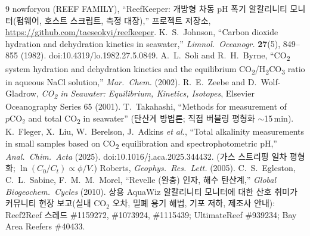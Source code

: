 \documentclass[11pt]{article}
\newcommand{\co}{\ensuremath{\mathrm{CO_2}}}
\begin{document}
\begin{thebibliography}{9}
 nowforyou (REEF FAMILY), ``ReefKeeper: 개방형 차동 pH 폭기
알칼리니티 모니터(펌웨어, 호스트 스크립트, 측정 대장),'' 프로젝트 저장소,
\url{https://github.com/taeseokyi/reefkeeper}.
 K.~S.~Johnson, ``Carbon dioxide hydration and dehydration
kinetics in seawater,'' \emph{Limnol.\ Oceanogr.} \textbf{27}(5), 849--855
(1982). doi:10.4319/lo.1982.27.5.0849.
 A.~L.~Soli and R.~H.~Byrne, ``CO\textsubscript{2} system
hydration and dehydration kinetics and the equilibrium CO\textsubscript{2}/H\textsubscript{2}CO\textsubscript{3}
ratio in aqueous NaCl solution,'' \emph{Mar.\ Chem.} (2002).
 R.~E.~Zeebe and D.~Wolf-Gladrow, \emph{CO\textsubscript{2}
in Seawater: Equilibrium, Kinetics, Isotopes}, Elsevier Oceanography Series 65
(2001).
 T.~Takahashi, ``Methods for measurement of
$p\mathrm{CO_2}$ and total CO\textsubscript{2} in seawater'' (탄산계 방법론;
직접 버블링 평형화 $\sim$15\,min).
 K.~Fleger, X.~Liu, W.~Berelson, J.~Adkins \emph{et al.},
``Total alkalinity measurements in small samples based on
CO\textsubscript{2} equilibration and spectrophotometric pH,''
\emph{Anal.\ Chim.\ Acta} (2025). doi:10.1016/j.aca.2025.344432.
 (가스 스트리핑 일차 평형화;
$\ln(C_0/C_t)\propto \phi/V$.) Roberts, \emph{Geophys.\ Res.\ Lett.} (2005).
 C.~S.~Egleston, C.~L.~Sabine, F.~M.~M.~Morel,
``Revelle (완충) 인자, 해수 탄산계,''
\emph{Global Biogeochem.\ Cycles} (2010).
 상용 AquaWiz 알칼리니티 모니터에 대한 산호 취미가 커뮤니티 현장
보고(실내 \co{} 오차, 밀폐 용기 해법, 기포 저하, 제조사 안내): Reef2Reef 스레드
\#1159272, \#1073924, \#1115439; UltimateReef \#939234; Bay Area Reefers \#40433.
\end{thebibliography}
\end{document}
